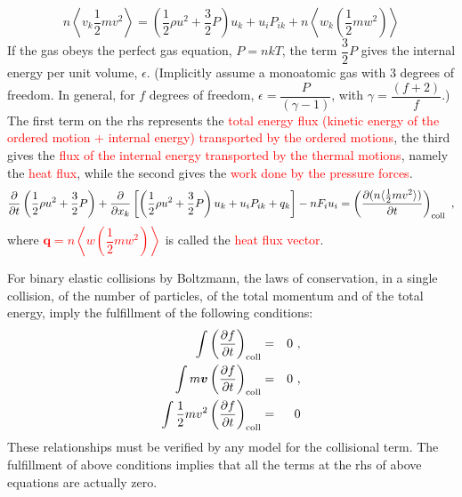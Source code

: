\documentclass[12pt,a4paper]{article}
\renewcommand{\vec}[1]{\boldsymbol{#1}}
\begin{document}
\begin{equation}
n\left\langle v_k \frac{1}{2} mv^2 \right\rangle = \left(\frac{1}{2}\rho u^2 +\frac{3}{2} P\right) u_k +u_i P_{ik} + n \left\langle \mathit{w}_k \left(\frac{1}{2}m\mathit{w}^2 \right) \right\rangle
\end{equation}
If the gas obeys the perfect gas equation, $P = nkT$, the term $\dfrac{3}{2} P$ gives the internal energy per unit volume, $\epsilon$. (Implicitly assume a monoatomic gas with $3$ degrees of freedom. In general, for $f$ degrees of freedom, $\epsilon = \dfrac{P}{(\gamma -1)}$, with $\gamma = \dfrac{(f + 2)}{f}$.) The first term on the rhs represents the \textcolor{red}{total energy flux (kinetic energy of the ordered motion + internal energy) transported by the ordered motions}, the third gives the \textcolor{red}{flux of the internal energy transported by the thermal motions}, namely the \textcolor{red}{heat flux}, while the second gives the \textcolor{red}{work done by the pressure forces}.
\begin{equation}
\frac{\partial}{\partial t} \left(\frac{1}{2}\rho u^2 +\frac{3}{2}P \right) + \frac{\partial}{\partial x_k} \left[\left(\frac{1}{2}\rho u^2 +\frac{3}{2}P \right)u_k +u_i P_{ik} +q_k \right] -nF_i u_i = \left(\frac{\partial (n \langle \frac{1}{2}mv^2\rangle)}{\partial t} \right)_{\rm coll} ~,
\end{equation}
where \textcolor{red}{$\vec{q} = n\left\langle \vec{\mathit{w}} \left(\dfrac{1}{2} m\mathit{w}^2 \right)\right\rangle$} is called the \textcolor{red}{heat flux vector}.

For binary elastic collisions by Boltzmann, the laws of conservation, in a single collision, of the number of particles, of the total momentum and of the total energy, imply the fulfillment of the following conditions:
\begin{eqnarray*}
\int \left(\frac{\partial f}{\partial t} \right)_{\rm coll} &=& 0 ~, \\
\int m\vec{v} \left(\frac{\partial f}{\partial t} \right)_{\rm coll} &=& 0 ~, \\
\int \frac{1}{2} m v^2 \left(\frac{\partial f}{\partial t} \right)_{\rm coll} &=& 0
\end{eqnarray*}
These relationships must be verified by any model for the collisional term. The fulfillment of above conditions implies that all the terms at the rhs of above equations are actually zero.
\end{document}
